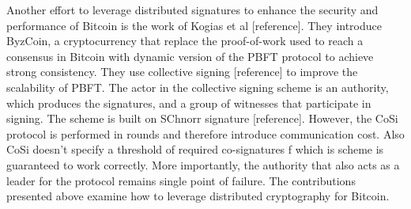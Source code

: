 Another effort to leverage distributed signatures to enhance the security and performance of Bitcoin is the work of Kogias et al [reference]. They introduce ByzCoin, a cryptocurrency that replace the proof-of-work used to reach a consensus in Bitcoin with dynamic version of the PBFT protocol to achieve strong consistency. They use collective signing [reference] to improve the scalability of PBFT. The actor in the collective signing scheme is an authority, which produces the signatures, and a group of witnesses that participate in signing. The scheme is built on SChnorr signature [reference]. However, the CoSi protocol is performed in rounds and therefore introduce communication cost. Also CoSi doesn’t specify a threshold of required co-signatures f which is scheme is guaranteed to work correctly. More importantly, the authority that also acts as a leader for the protocol remains single point of failure. The contributions presented above examine how to leverage distributed cryptography for Bitcoin. 
